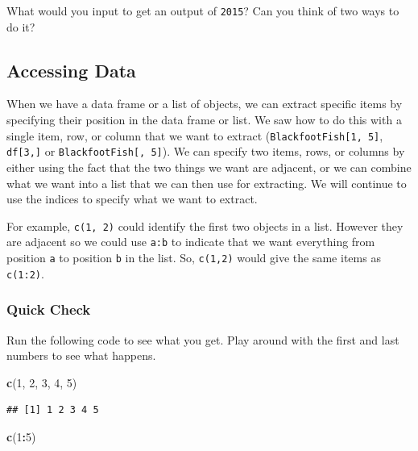 \documentclass[
  10pt,
  letterpaper,
  twoside,
  openright]{book}
\newenvironment{Shaded}{\begin{snugshade}}{\end{snugshade}}
\newcommand{\DecValTok}[1]{\textcolor[rgb]{0.00,0.00,0.81}{#1}}
\newcommand{\FunctionTok}[1]{\textcolor[rgb]{0.13,0.29,0.53}{\textbf{#1}}}
\newcommand{\NormalTok}[1]{#1}
\newcommand{\SpecialCharTok}[1]{\textcolor[rgb]{0.81,0.36,0.00}{\textbf{#1}}}
\begin{document}
What would you input to get an output of \texttt{2015}? Can you think of
two ways to do it?

\hypertarget{accessing-data}{%
\subsection{Accessing Data}\label{accessing-data}}

When we have a data frame or a list of objects, we can extract specific
items by specifying their position in the data frame or list. We saw how
to do this with a single item, row, or column that we want to extract
(\texttt{BlackfootFish{[}1,\ 5{]}}, \texttt{df{[}3,{]}} or
\texttt{BlackfootFish{[},\ 5{]}}). We can specify two items, rows, or
columns by either using the fact that the two things we want are
adjacent, or we can combine what we want into a list that we can then
use for extracting. We will continue to use the indices to specify what
we want to extract.

For example, \texttt{c(1,\ 2)} could identify the first two objects in a
list. However they are adjacent so we could use \texttt{a:b} to indicate
that we want everything from position \texttt{a} to position \texttt{b}
in the list. So, \texttt{c(1,2)} would give the same items as
\texttt{c(1:2)}.

\hypertarget{quick-check}{%
\subsubsection{Quick Check}\label{quick-check}}

Run the following code to see what you get. Play around with the first
and last numbers to see what happens.

\begin{Shaded}
\begin{Highlighting}[]
\FunctionTok{c}\NormalTok{(}\DecValTok{1}\NormalTok{, }\DecValTok{2}\NormalTok{, }\DecValTok{3}\NormalTok{, }\DecValTok{4}\NormalTok{, }\DecValTok{5}\NormalTok{)}
\end{Highlighting}
\end{Shaded}

\begin{verbatim}
## [1] 1 2 3 4 5
\end{verbatim}

\begin{Shaded}
\begin{Highlighting}[]
\FunctionTok{c}\NormalTok{(}\DecValTok{1}\SpecialCharTok{:}\DecValTok{5}\NormalTok{)}
\end{Highlighting}
\end{Shaded}
\end{document}

